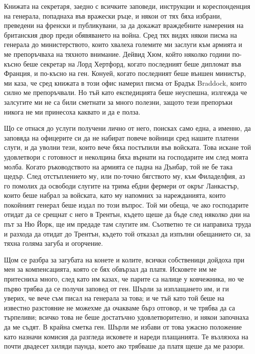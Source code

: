 \documentclass[12pt]{book}
\begin{document}
Книжата на секретаря, заедно с всичките заповеди, инструкции и кореспонденция на генерала, попаднаха във вражески ръце, и някои от тях бяха избрани, преведени на френски и публикувани, за да докажат враждебните намерения на британския двор преди обявяването на война. Сред тях видях някои писма на генерала до министерството, които хвалеха големите ми заслуги към армията и ме препоръчваха на тяхното внимание. Дейвид Хюм, който няколко години по-късно беше секретар на Лорд Хертфорд, когато последният беше дипломат във Франция, и по-късно на ген. Конуей, когато последният беше външен министър, ми каза, че сред книжата в този офис намерил писма от Брадък Braddock, които силно ме препоръчвали. Но тъй като експедицията беше неуспешна, излгежда че залсугите ми не са били сметнати за много полезни, защото тези препоръки никога не ми принесоха каквато и да е полза. 

Що се отнася до услуги получени лично от него, поисках само една, а именно, да заповяда на офицерите си да не набират повече войници сред нашите платени слуги, и да уволни тези, които вече бяха постъпили във войската. Това искане той удовлетвори с готовност и неколцина бяха върнати на господарите им след моята молба. Когато ръководството на армията се падна на Дънбар, той не бе така щедър. След отстъплението му, или по-точно бягството му, към Филаделфия, аз го помолих да освободи слугите на трима ебдни фермери от окръг Ланкастър, които беше набрал за войската, като му напомних за нарежданията, които покойният генерал беше издал по този въпрос. Той ми обеща, че ако господарите отидат да се срещнат с него в Трентън, където щеше да бъде след няколко дни на път за Ню Йорк, ще им предаде там слугите им. Съответно те си направиха труда и разхода да отидат до Трентън, където той отказал да изпълни обещанието си, за тяхна голяма загуба и огорчение. 

Щом се разбра за загубата на конете и колите, всички собственици дойдоха при мен за компенсацията, която се бях обвързал да платя. Исковете им ме притесниха много, след като им казах, че парите са налице у ковчежника, но че първо трябва да се получи заповед от ген. Шърли за изплащането им, и ги уверих, че вече съм писал на генерала за това; и че тъй като той беше на известно разстояние не можехме да очакваме бърз отговор, и че трябва да са търпеливи; всичко това не беше достатъчно удовлетворително, и някои започнаха да ме съдят. В крайна сметка ген. Шърли ме избави от това ужасно положение като назначи комисия да разгледа исковете и нареди плащанията. Те възлязоха на почти двадесет хиляди паунда, което ако трябваше да платя щеше да ме разори. 
\end{document}
